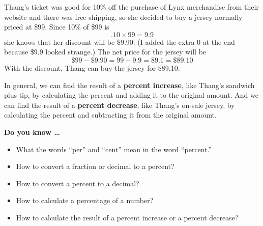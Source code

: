 Thang's ticket was good for 10\% off the purchase of Lynx merchandise from their website and there was free shipping, so she decided to buy a jersey normally priced at \$99. Since 10\% of \$99 is $$.10 \times 99 = 9.9$$ she knows that her discount will be \$9.90.  (I added the extra 0 at the end because \$9.9 looked strange.) The net price for the jersey will be $$\$99 - \$9.90 = 99 - 9.9 = 89.1 = \$89.10$$
With the discount, Thang can buy the jersey for \$89.10.

In general, we can find the result of a \textbf{percent increase}, like Thang's sandwich plus tip, by calculating the percent and adding it to the original amount.
And we can find the result of a \textbf{percent decrease}, like Thang's on-sale jersey, by calculating the percent and subtracting it from the original amount.

%
%

 

\noindent \textbf{Do you know \ldots}

\begin{itemize}
\item What the words ``per'' and ``cent'' mean in the word ``percent.''
\item How to convert a fraction or decimal to a percent? 
\item How to convert a percent to a decimal? %
\item How to calculate a percentage of a number? %
\item How to calculate the result of a percent increase or a percent decrease? %
  
\end{itemize}

